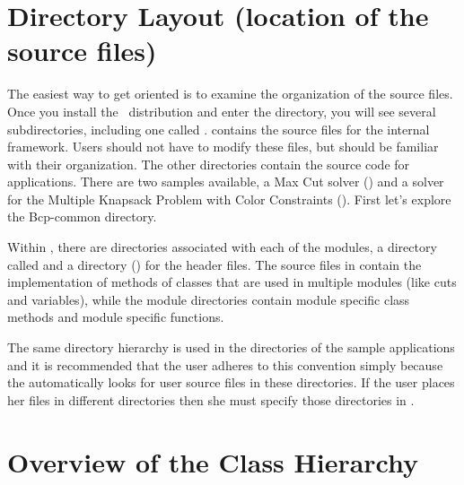 
\section{Directory Layout (location of the source files)}
\label{dev:source-files}

The easiest way to get oriented is to examine the organization of the
source files. Once you install the \BB\ distribution and enter the
 directory, you will see several subdirectories, including
one called .  contains the source
files for the internal framework. Users should not have to modify
these files, but should be familiar with their organization. The other
directories contain the source code for applications. There are two
samples available, a Max Cut solver () and a solver for
the Multiple Knapsack Problem with Color Constraints ().
First let's explore the Bcp-common directory.

Within , there are directories associated with each
of the modules, a directory called  and a directory 
() for the header files. The source files in 
contain the implementation of methods of classes that are used in
multiple modules (like cuts and variables), while the module
directories contain module specific class methods and module specific
functions.

The same directory hierarchy is used in the directories of the sample
applications and it is recommended that the user adheres to this
convention simply because the  automatically looks
for user source files in these directories. If the user places her
files in different directories then she must specify those directories
in .

\section{Overview of the Class Hierarchy}
\label{dev:overview-hierarchy}


